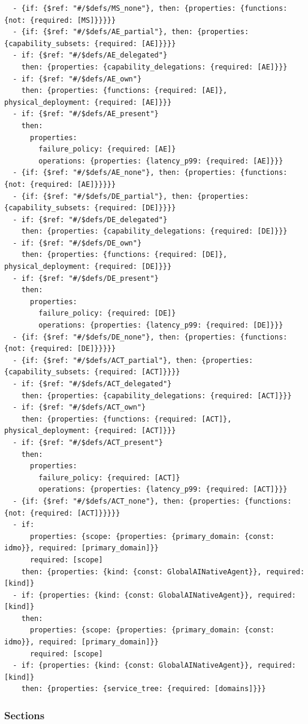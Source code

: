 \begin{verbatim}
  - {if: {$ref: "#/$defs/MS_none"}, then: {properties: {functions: {not: {required: [MS]}}}}}
  - {if: {$ref: "#/$defs/AE_partial"}, then: {properties: {capability_subsets: {required: [AE]}}}}
  - if: {$ref: "#/$defs/AE_delegated"}
    then: {properties: {capability_delegations: {required: [AE]}}}
  - if: {$ref: "#/$defs/AE_own"}
    then: {properties: {functions: {required: [AE]}, physical_deployment: {required: [AE]}}}
  - if: {$ref: "#/$defs/AE_present"}
    then:
      properties:
        failure_policy: {required: [AE]}
        operations: {properties: {latency_p99: {required: [AE]}}}
  - {if: {$ref: "#/$defs/AE_none"}, then: {properties: {functions: {not: {required: [AE]}}}}}
  - {if: {$ref: "#/$defs/DE_partial"}, then: {properties: {capability_subsets: {required: [DE]}}}}
  - if: {$ref: "#/$defs/DE_delegated"}
    then: {properties: {capability_delegations: {required: [DE]}}}
  - if: {$ref: "#/$defs/DE_own"}
    then: {properties: {functions: {required: [DE]}, physical_deployment: {required: [DE]}}}
  - if: {$ref: "#/$defs/DE_present"}
    then:
      properties:
        failure_policy: {required: [DE]}
        operations: {properties: {latency_p99: {required: [DE]}}}
  - {if: {$ref: "#/$defs/DE_none"}, then: {properties: {functions: {not: {required: [DE]}}}}}
  - {if: {$ref: "#/$defs/ACT_partial"}, then: {properties: {capability_subsets: {required: [ACT]}}}}
  - if: {$ref: "#/$defs/ACT_delegated"}
    then: {properties: {capability_delegations: {required: [ACT]}}}
  - if: {$ref: "#/$defs/ACT_own"}
    then: {properties: {functions: {required: [ACT]}, physical_deployment: {required: [ACT]}}}
  - if: {$ref: "#/$defs/ACT_present"}
    then:
      properties:
        failure_policy: {required: [ACT]}
        operations: {properties: {latency_p99: {required: [ACT]}}}
  - {if: {$ref: "#/$defs/ACT_none"}, then: {properties: {functions: {not: {required: [ACT]}}}}}
  - if:
      properties: {scope: {properties: {primary_domain: {const: idmo}}, required: [primary_domain]}}
      required: [scope]
    then: {properties: {kind: {const: GlobalAINativeAgent}}, required: [kind]}
  - if: {properties: {kind: {const: GlobalAINativeAgent}}, required: [kind]}
    then:
      properties: {scope: {properties: {primary_domain: {const: idmo}}, required: [primary_domain]}}
      required: [scope]
  - if: {properties: {kind: {const: GlobalAINativeAgent}}, required: [kind]}
    then: {properties: {service_tree: {required: [domains]}}}
\end{verbatim}

\hypertarget{a.1.2-sections}{%
\subsubsection{Sections}\label{a.1.2-sections}}

